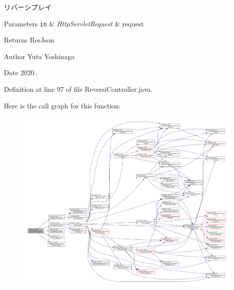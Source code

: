 リバーシプレイ 


\begin{DoxyParams}[1]{Parameters}
\mbox{\tt in}  & {\em Http\+Servlet\+Request} & request \\
\hline
\end{DoxyParams}
\begin{DoxyReturn}{Returns}
Res\+Json 
\end{DoxyReturn}
\begin{DoxyAuthor}{Author}
Yuta Yoshinaga 
\end{DoxyAuthor}
\begin{DoxyDate}{Date}
2020.. 
\end{DoxyDate}


Definition at line 97 of file Reversi\+Controller.\+java.

Here is the call graph for this function\+:
\nopagebreak
\begin{figure}[H]
\begin{center}
\leavevmode
\includegraphics[width=350pt]{classjp_1_1gr_1_1java__conf_1_1yuta__yoshinaga_1_1reversi_1_1controller_1_1_reversi_controller_a3c9b089c78395e6a87cf873816a2f50d_cgraph}
\end{center}
\end{figure}
\mbox{\label{classjp_1_1gr_1_1java__conf_1_1yuta__yoshinaga_1_1reversi_1_1controller_1_1_reversi_controller_a1d06864481177386fe8d2b01216790f4}} 
